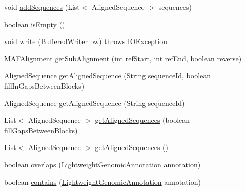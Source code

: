 \begin{DoxyCompactItemize}
\item 
void \hyperlink{classbroad_1_1core_1_1multiplealignment_1_1_m_a_f_alignment_a1244b0d59bc025d36f2bbf0eeab9d392}{add\+Sequences} (List$<$ Aligned\+Sequence $>$ sequences)
\item 
boolean \hyperlink{classbroad_1_1core_1_1multiplealignment_1_1_m_a_f_alignment_ac9afcd9e472b40be045969b06ae38ab6}{is\+Empty} ()
\item 
void \hyperlink{classbroad_1_1core_1_1multiplealignment_1_1_m_a_f_alignment_ad5288744d1f6d210feccf4a0cbee7237}{write} (Buffered\+Writer bw)  throws I\+O\+Exception 
\item 
\hyperlink{classbroad_1_1core_1_1multiplealignment_1_1_m_a_f_alignment}{M\+A\+F\+Alignment} \hyperlink{classbroad_1_1core_1_1multiplealignment_1_1_m_a_f_alignment_a4bec03246b949c3d8a49cedfa062eaf0}{get\+Sub\+Alignment} (int ref\+Start, int ref\+End, boolean \hyperlink{classbroad_1_1core_1_1multiplealignment_1_1_m_a_f_alignment_a49860e2e33fada19f96d79e80f83846d}{reverse})
\item 
Aligned\+Sequence \hyperlink{classbroad_1_1core_1_1multiplealignment_1_1_m_a_f_alignment_a6cbc6fde4d47f8b1a74569021d844f29}{get\+Aligned\+Sequence} (String sequence\+Id, boolean fill\+In\+Gaps\+Between\+Blocks)
\item 
Aligned\+Sequence \hyperlink{classbroad_1_1core_1_1multiplealignment_1_1_m_a_f_alignment_acb42e3a732f8d5389ab457c133c35051}{get\+Aligned\+Sequence} (String sequence\+Id)
\item 
List$<$ Aligned\+Sequence $>$ \hyperlink{classbroad_1_1core_1_1multiplealignment_1_1_m_a_f_alignment_a435da7e3532bbc433ec02f970ecf3707}{get\+Aligned\+Sequences} (boolean fill\+Gaps\+Between\+Blocks)
\item 
List$<$ Aligned\+Sequence $>$ \hyperlink{classbroad_1_1core_1_1multiplealignment_1_1_m_a_f_alignment_a830710becb0a3b9c712a558691cb6efa}{get\+Aligned\+Sequences} ()
\item 
boolean \hyperlink{classbroad_1_1core_1_1multiplealignment_1_1_m_a_f_alignment_a3324e1c0c4536d66690a5ec6365056c6}{overlaps} (\hyperlink{interfacebroad_1_1core_1_1annotation_1_1_lightweight_genomic_annotation}{Lightweight\+Genomic\+Annotation} annotation)
\item 
boolean \hyperlink{classbroad_1_1core_1_1multiplealignment_1_1_m_a_f_alignment_a822c6167e78e38c9234dc27ac2f6e869}{contains} (\hyperlink{interfacebroad_1_1core_1_1annotation_1_1_lightweight_genomic_annotation}{Lightweight\+Genomic\+Annotation} annotation)
\item 

\end{DoxyCompactItemize}
